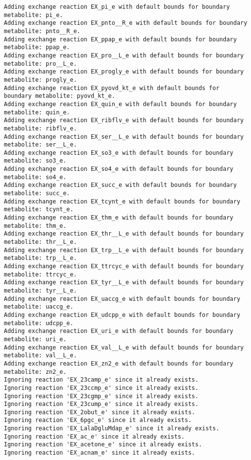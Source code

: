 \documentclass[
  letterpaper,
  DIV=11,
  numbers=noendperiod]{scrartcl}
\begin{document}
\begin{verbatim}
Adding exchange reaction EX_pi_e with default bounds for boundary metabolite: pi_e.
Adding exchange reaction EX_pnto__R_e with default bounds for boundary metabolite: pnto__R_e.
Adding exchange reaction EX_ppap_e with default bounds for boundary metabolite: ppap_e.
Adding exchange reaction EX_pro__L_e with default bounds for boundary metabolite: pro__L_e.
Adding exchange reaction EX_progly_e with default bounds for boundary metabolite: progly_e.
Adding exchange reaction EX_pyovd_kt_e with default bounds for boundary metabolite: pyovd_kt_e.
Adding exchange reaction EX_quin_e with default bounds for boundary metabolite: quin_e.
Adding exchange reaction EX_ribflv_e with default bounds for boundary metabolite: ribflv_e.
Adding exchange reaction EX_ser__L_e with default bounds for boundary metabolite: ser__L_e.
Adding exchange reaction EX_so3_e with default bounds for boundary metabolite: so3_e.
Adding exchange reaction EX_so4_e with default bounds for boundary metabolite: so4_e.
Adding exchange reaction EX_succ_e with default bounds for boundary metabolite: succ_e.
Adding exchange reaction EX_tcynt_e with default bounds for boundary metabolite: tcynt_e.
Adding exchange reaction EX_thm_e with default bounds for boundary metabolite: thm_e.
Adding exchange reaction EX_thr__L_e with default bounds for boundary metabolite: thr__L_e.
Adding exchange reaction EX_trp__L_e with default bounds for boundary metabolite: trp__L_e.
Adding exchange reaction EX_ttrcyc_e with default bounds for boundary metabolite: ttrcyc_e.
Adding exchange reaction EX_tyr__L_e with default bounds for boundary metabolite: tyr__L_e.
Adding exchange reaction EX_uaccg_e with default bounds for boundary metabolite: uaccg_e.
Adding exchange reaction EX_udcpp_e with default bounds for boundary metabolite: udcpp_e.
Adding exchange reaction EX_uri_e with default bounds for boundary metabolite: uri_e.
Adding exchange reaction EX_val__L_e with default bounds for boundary metabolite: val__L_e.
Adding exchange reaction EX_zn2_e with default bounds for boundary metabolite: zn2_e.
Ignoring reaction 'EX_23camp_e' since it already exists.
Ignoring reaction 'EX_23ccmp_e' since it already exists.
Ignoring reaction 'EX_23cgmp_e' since it already exists.
Ignoring reaction 'EX_23cump_e' since it already exists.
Ignoring reaction 'EX_2obut_e' since it already exists.
Ignoring reaction 'EX_6pgc_e' since it already exists.
Ignoring reaction 'EX_LalaDgluMdap_e' since it already exists.
Ignoring reaction 'EX_ac_e' since it already exists.
Ignoring reaction 'EX_acetone_e' since it already exists.
Ignoring reaction 'EX_acnam_e' since it already exists.

\end{verbatim}
\end{document}
